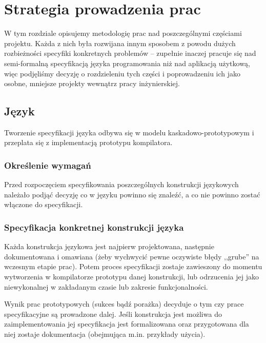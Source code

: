 \chapter{Strategia prowadzenia prac}
\label{strategia_prac}

W tym rozdziale opisujemy metodologię prac nad poszczególnymi częściami projektu. Każda z nich była rozwijana
innym sposobem z powodu dużych rozbieżności specyfiki konkretnych problemów -- zupełnie inaczej pracuje się
nad semi-formalną specyfikacją języka programowania niż nad aplikacją użytkową, więc podjęliśmy decyzję o
rozdzieleniu tych części i poprowadzeniu ich jako osobne, mniejsze projekty wewnątrz pracy inżynierskiej.

\section{Język \ViuAct}


Tworzenie specyfikacji języka odbywa się w modelu kaskadowo-prototypowym i przeplata się z implementacją
prototypu kompilatora.

\subsection{Określenie wymagań}

Przed rozpoczęciem specyfikowania poszczególnych konstrukcji językowych należało podjąć decyzję co w języku
powinno się znaleźć, a co nie powinno zostać włączone do specyfikacji.

\subsection{Specyfikacja konkretnej konstrukcji języka}

Każda konstrukcja językowa jest najpierw projektowana, następnie dokumentowana i omawiana (żeby wychwycić
pewne oczywiste błędy ,,grube'' na wczesnym etapie prac). Potem proces specyfikacji zostaje zawieszony do
momentu wytworzenia w kompilatorze prototypu danej konstrukcji, lub odrzucenia jej jako niewykonalnej w
zakładanym czasie lub zakresie funkcjonalności.

Wynik prac prototypowych (sukces bądź porażka) decyduje o tym czy prace specyfikacyjne są prowadzone dalej.
Jeśli konstrukcja jest możliwa do zaimplementowania jej specyfikacja jest formalizowana oraz przygotowana dla
niej zostaje dokumentacja (obejmująca m.in. przykłady użycia).

